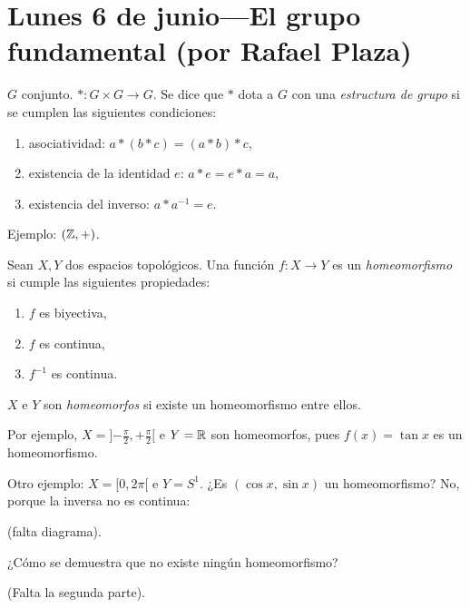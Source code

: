 \section*{Lunes 6 de junio---El grupo fundamental (por Rafael Plaza)}

\(G\) conjunto. \(*\colon G × G\to G\).
Se dice que \(*\) dota a \(G\) con una \emph{estructura de grupo}
si se cumplen las siguientes condiciones:
\begin{enumerate}
  \item asociatividad: \(a * (b * c) = (a * b) * c\),
  \item existencia de la identidad \(e\):
    \(a * e = e * a = a\),
  \item existencia del inverso:
    \(a * a^{-1} = e\).
\end{enumerate}
Ejemplo: \((\mathbb{Z}, +)\).

Sean \(X, Y\) dos espacios topológicos.
Una función \(f\colon X\to Y\) es un \emph{homeomorfismo}
si cumple las siguientes propiedades:
\begin{enumerate}
  \item \(f\) es biyectiva,
  \item \(f\) es continua,
  \item \(f^{-1}\) es continua.
\end{enumerate}
\(X\) e \(Y\) son \emph{homeomorfos}
si existe  un homeomorfismo entre ellos.

Por ejemplo,
\(X = ]{-\frac{π}{2}}, {+\frac{π}{2}}[\) e
\(Y = \mathbb{R}\) son homeomorfos,
pues \(f(x) = \tan x\) es un homeomorfismo.

Otro ejemplo: \(X = [0, 2π[\) e \(Y = S^1\).
¿Es \((\cos x, \sin x)\) un homeomorfismo?
No, porque la inversa no es continua:

(falta diagrama).

¿Cómo se demuestra que no existe ningún homeomorfismo?

(Falta la segunda parte).
